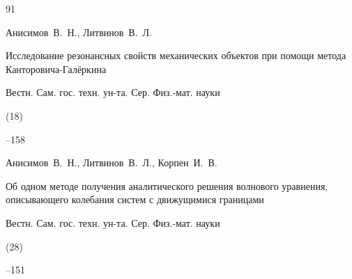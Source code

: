 \begin{thebibliography}{91}
















\by Анисимов~В.~Н., Литвинов~В.~Л.

\paper Исследование резонансных свойств механических объектов при помощи метода Канторовича-Галёркина

\jour Вестн. Сам. гос. техн. ун-та. Сер. Физ.-мат. науки


(18)

--158


%











\by Анисимов~В.~Н., Литвинов~В.~Л., Корпен~И.~В.

\paper Об одном методе получения аналитического решения волнового уравнения, описывающего колебания систем с движущимися границами 

\jour Вестн. Сам. гос. техн. ун-та. Сер. Физ.-мат. науки


(28)

--151



\end{thebibliography}

